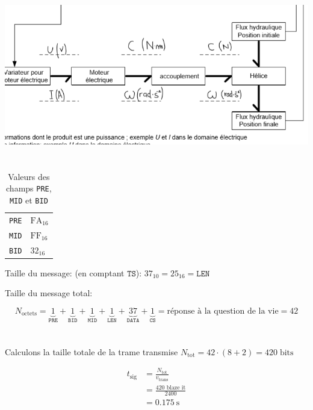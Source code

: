 \documentclass{article}
\begin{document}
\includegraphics[width=\textwidth]{dr2.png}

\setcounter{section}{21}
\section{}

\begin{table}[h]
    \centering
    \begin{tabular}{ll}
        \texttt{PRE} & $\text{FA}_{16}$ \\
        \texttt{MID} & $\text{FF}_{16}$ \\
        \texttt{BID} & $\text{32}_{16}$
    \end{tabular}
    \caption{Valeurs des champs \texttt{PRE}, \texttt{MID} et \texttt{BID}}
    \label{tab:}
\end{table}

Taille du message: (en comptant $\texttt{TS}$): $37_{10} = 25_{16} = \texttt{LEN}$

Taille du message total:

$$ N_\text{octets} = \underbrace{1}_\texttt{PRE} + \underbrace{1}_\texttt{BID} + \underbrace{1}_\texttt{MID} + \underbrace{1}_\texttt{LEN} + \underbrace{37}_\texttt{DATA} + \underbrace{1}_\texttt{CS} = \text{réponse à la question de la vie} = 42$$

\section{}

Calculons la taille totale de la trame transmise $N_{\text{tot}} = 42 \cdot (8+2) = 420\;\text{bits}$

\begin{equation*}
    \begin{split}
        t_\text{sig} &= \frac{N_\text{tot}}{v_\text{trans}} \\
        &= \frac{\text{420 blaze it}}{2400} \\
        &= \SI{0.175}{\second}
    \end{split}
\end{equation*}
\end{document}
